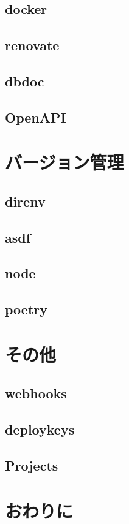 \subsection{docker}
\subsection{renovate}
\subsection{dbdoc}
\subsection{OpenAPI}

\section{バージョン管理}

\subsection{direnv}
\subsection{asdf}
\subsection{node}
\subsection{poetry}

\section{その他}
\subsection{webhooks}
\subsection{deploykeys}
\subsection{Projects}

\section{おわりに}